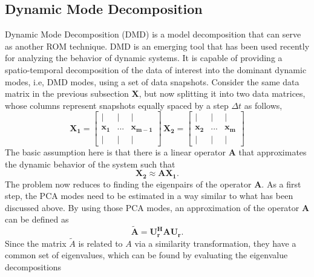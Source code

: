 \documentclass{anstrans}
\begin{document}
\subsection*{Dynamic Mode Decomposition}
Dynamic Mode Decomposition (DMD) is a model decomposition that can serve as another ROM technique. DMD is an emerging tool that has been used recently for analyzing the behavior of dynamic systems. It is capable of providing a spatio-temporal decomposition of the data of interest into the dominant dynamic modes, i.e, DMD modes, using a set of data snapshots.
Consider the same data matrix in the previous subsection $\textbf{X}$, but now splitting it into two data matrices, whose columns represent snapshots equally spaced by a step $\Delta t$ as follows,
\begin{subequations}
\begin{equation}
	\mathbf{X_1}=\left[\begin{array}{cccc}
	| & | &    | \\ 
	{\mathbf{x_1}} &   ... & {\mathbf{x_{m-1}}} \\ 
	| & | &  |
	\end{array} \right]\, 
   \end{equation}
    \begin{equation}
	{\mathbf{X_2}}=\left[\begin{array}{ccc}
	| & | &   | \\ 
	{\mathbf{x_2}} &  ... & {\mathbf{x_{m}}} \\ 
    | & | &   |
	\end{array} \right] 
    \end{equation}
    \end{subequations}
 The basic assumption here is that there is a linear operator $\textbf{A}$ that approximates the dynamic behavior of the system  such that
\begin{equation}
\mathbf{X_2} \approx \mathbf{A X_1}.
 \end{equation}
 The problem now reduces to finding the eigenpairs of the operator $\textbf{A}$. As a first step,  the PCA modes need to be estimated in a way similar to what has been discussed above.
By using those PCA modes, an approximation of the operator $\textbf{A}$ can be defined as
 \begin{equation}
 \mathbf{\tilde{A} = U_r^{H} A U_r}.
 \end{equation}
 Since the matrix $\tilde{A}$ is related to $A$ via a similarity transformation, they have a common set of eigenvalues, which can be found by evaluating the eigenvalue decompositions
\end{document}
